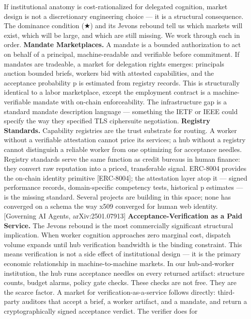 \documentclass[
]{article}
\newcounter{none} %
\begin{document}
If institutional anatomy is cost-rationalized for delegated cognition,
market design is not a discretionary engineering choice --- it is a
structural consequence. The dominance condition (★) and its Jevons
rebound tell us which markets will exist, which will be large, and which
are still missing. We work through each in order. \textbf{Mandate
Marketplaces.} A mandate is a bounded authorization to act on behalf of
a principal, machine-readable and verifiable before commitment. If
mandates are tradeable, a market for delegation rights emerges:
principals auction bounded briefs, workers bid with attested
capabilities, and the acceptance probability p is estimated from
registry records. This is structurally identical to a labor marketplace,
except the employment contract is a machine-verifiable mandate with
on-chain enforceability. The infrastructure gap is a standard mandate
description language --- something the IETF or IEEE could specify the
way they specified TLS ciphersuite negotiation. \textbf{Registry
Standards.} Capability registries are the trust substrate for routing. A
worker without a verifiable attestation cannot price its services; a hub
without a registry cannot distinguish a reliable worker from one
optimizing for acceptance needles. Registry standards serve the same
function as credit bureaus in human finance: they convert raw reputation
into a priced, transferable signal. ERC-8004 provides the on-chain
identity primitive {[}ERC-8004{]}; the attestation layer atop it ---
signed performance records, domain-specific competency tests, historical
p estimates --- is the missing standard. Several projects are building
in this space; none has converged on a schema the way x509 converged for
human web identity. {[}Governing AI Agents, arXiv:2501.07913{]}
\textbf{Acceptance-Verification as a Paid Service.} The Jevons rebound
is the most commercially significant structural implication. When worker
cognition approaches zero marginal cost, dispatch volume expands until
hub verification bandwidth is the binding constraint. This means
verification is not a side effect of institutional design --- it is the
primary economic relationship in machine-to-machine markets. In our
hub-and-worker institution, the hub runs acceptance needles on every
returned artifact: structure counts, budget alarms, policy gate checks.
These checks are not free. They are the scarce factor. A market for
verification-as-a-service follows directly: third-party auditors that
accept a brief, a worker artifact, and a mandate, and return a
cryptographically signed acceptance verdict. The verifier does for
\end{document}
